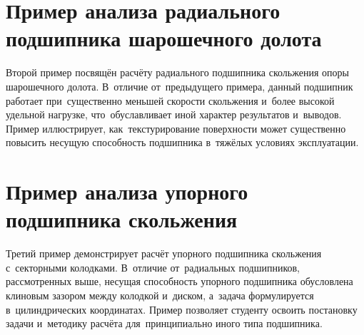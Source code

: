 


\section{Пример анализа радиального подшипника шарошечного долота}

Второй пример посвящён расчёту радиального подшипника скольжения опоры шарошечного долота. В~отличие от~предыдущего примера, данный подшипник работает при~существенно меньшей скорости скольжения и~более высокой удельной нагрузке, что~обуславливает иной характер результатов и~выводов. Пример иллюстрирует, как~текстурирование поверхности может существенно повысить несущую способность подшипника в~тяжёлых условиях эксплуатации.




\section{Пример анализа упорного подшипника скольжения}

Третий пример демонстрирует расчёт упорного подшипника скольжения с~секторными колодками. В~отличие от~радиальных подшипников, рассмотренных выше, несущая способность упорного подшипника обусловлена клиновым зазором между колодкой и~диском, а~задача формулируется в~цилиндрических координатах. Пример позволяет студенту освоить постановку задачи и~методику расчёта для~принципиально иного типа подшипника.


